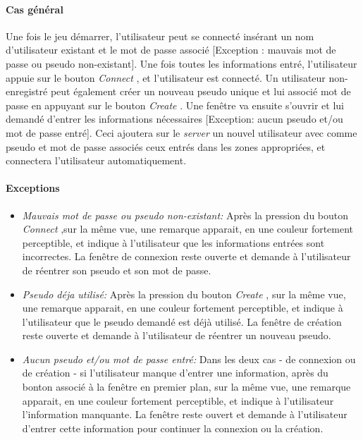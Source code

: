 \documentclass[a4paper,11pt]{report}
\begin{document}
\paragraph{Cas général}
Une fois le jeu démarrer, l'utilisateur peut se connecté insérant un nom d'utilisateur existant et le mot de passe associé
[Exception : mauvais mot de passe ou pseudo non-existant].
Une fois toutes les informations entré, l'utilisateur appuie sur le bouton \og \textit{Connect} \fg, et l'utilisateur est
connecté. Un utilisateur non-enregistré peut également créer un nouveau pseudo unique
et lui associé mot de passe en appuyant sur le bouton \og \textit{Create} .
Une fenêtre va ensuite s'ouvrir et lui demandé d'entrer les informations nécessaires 
[Exception: aucun pseudo et/ou mot de passe entré]. Ceci ajoutera sur le \textit{server} un nouvel utilisateur avec comme
pseudo et mot de passe associés ceux entrés dans les zones appropriées, et connectera l'utilisateur automatiquement.
\paragraph{Exceptions}
\begin{itemize}
 \item \textit{Mauvais mot de passe ou pseudo non-existant:} Après la pression du bouton \og \textit{Connect} \fg
 ,sur la même vue, une remarque apparait, en une couleur fortement
 perceptible, et indique à l'utilisateur que les informations entrées sont incorrectes. La fenêtre de connexion reste ouverte et
 demande à l'utilisateur de réentrer son pseudo et son mot de passe.
 \item \textit{Pseudo déja utilisé:} Après la pression du bouton \og \textit{Create} \fg,
 sur la même vue, une remarque apparait, en une couleur fortement
 perceptible, et indique à l'utilisateur que le pseudo demandé est déjà utilisé. La fenêtre de création reste ouverte
 et demande à l'utilisateur de réentrer un nouveau pseudo.
 \item \textit{Aucun pseudo et/ou mot de passe entré:} Dans les deux cas - de connexion ou de création - si l'utilisateur
 manque d'entrer une information, après du bonton associé à la fenêtre en premier plan, sur la même vue,
 une remarque apparait, en une couleur fortement perceptible, et indique à l'utilisateur l'information manquante. La
 fenêtre reste ouvert et demande à l'utilisateur d'entrer cette information pour continuer la connexion ou la création.
\end{itemize}
\end{document}
